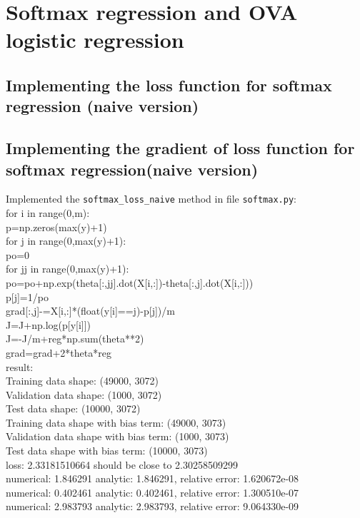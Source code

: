 \documentclass{article}
\begin{document}
\section{Softmax regression and OVA logistic regression}
\subsection{Implementing the loss function for softmax regression (naive version)}
\subsection{Implementing the gradient of loss function for softmax regression(naive version)}
Implemented the \verb|softmax_loss_naive| method in file \verb|softmax.py|:\\[10pt]
for i in range(0,m):\\
    p=np.zeros(max(y)+1)\\
    for j in range(0,max(y)+1):\\
	po=0\\
	for jj in range(0,max(y)+1):\\
		po=po+np.exp(theta[:,jj].dot(X[i,:])-theta[:,j].dot(X[i,:]))\\
	p[j]=1/po\\
    	grad[:,j]-=X[i,:]*(float(y[i]==j)-p[j])/m\\
    J=J+np.log(p[y[i]])\\
  J=-J/m+reg*np.sum(theta**2)\\
  grad=grad+2*theta*reg\\[10pt]
result:\\[10pt]
Training data shape:  (49000, 3072)\\
Validation data shape:  (1000, 3072)\\
Test data shape:  (10000, 3072)\\
Training data shape with bias term:  (49000, 3073)\\
Validation data shape with bias term:  (1000, 3073)\\
Test data shape with bias term:  (10000, 3073)\\
loss: 2.33181510664  should be close to  2.30258509299\\
numerical: 1.846291 analytic: 1.846291, relative error: 1.620672e-08\\
numerical: 0.402461 analytic: 0.402461, relative error: 1.300510e-07\\
numerical: 2.983793 analytic: 2.983793, relative error: 9.064330e-09\\
\end{document}
